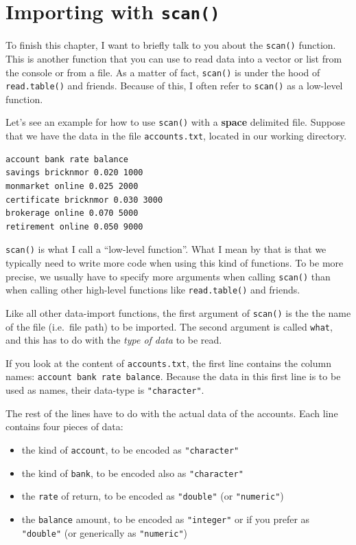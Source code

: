 \documentclass[
]{book}
\begin{document}
\hypertarget{importing-with-scan}{%
\section{\texorpdfstring{Importing with \texttt{scan()}}{Importing with scan()}}\label{importing-with-scan}}

To finish this chapter, I want to briefly talk to you about the \texttt{scan()}
function. This is another function that you can use to read data into a vector
or list from the console or from a file. As a matter of fact, \texttt{scan()} is
under the hood of \texttt{read.table()} and friends. Because of this, I often refer
to \texttt{scan()} as a low-level function.

Let's see an example for how to use \texttt{scan()} with a \textbf{space} delimited file.
Suppose that we have the data in the file \texttt{accounts.txt}, located in our
working directory.

\begin{verbatim}
account bank rate balance
savings bricknmor 0.020 1000
monmarket online 0.025 2000
certificate bricknmor 0.030 3000
brokerage online 0.070 5000
retirement online 0.050 9000
\end{verbatim}

\texttt{scan()} is what I call a ``low-level function''. What I mean by that is that
we typically need to write more code when using this kind of functions. To be
more precise, we usually have to specify more arguments when calling \texttt{scan()}
than when calling other high-level functions like \texttt{read.table()} and friends.

Like all other data-import functions, the first argument of \texttt{scan()} is the
the name of the file (i.e.~file path) to be imported. The second argument is
called \texttt{what}, and this has to do with the \emph{type of data} to be read.

If you look at the content of \texttt{accounts.txt}, the first line contains the
column names: \texttt{account\ bank\ rate\ balance}. Because the data in this first line
is to be used as names, their data-type is \texttt{"character"}.

The rest of the lines have to do with the actual data of the accounts. Each
line contains four pieces of data:

\begin{itemize}
\item
  the kind of \texttt{account}, to be encoded as \texttt{"character"}
\item
  the kind of \texttt{bank}, to be encoded also as \texttt{"character"}
\item
  the \texttt{rate} of return, to be encoded as \texttt{"double"} (or \texttt{"numeric"})
\item
  the \texttt{balance} amount, to be encoded as \texttt{"integer"} or if you prefer as
  \texttt{"double"} (or generically as \texttt{"numeric"})
\end{itemize}
\end{document}
